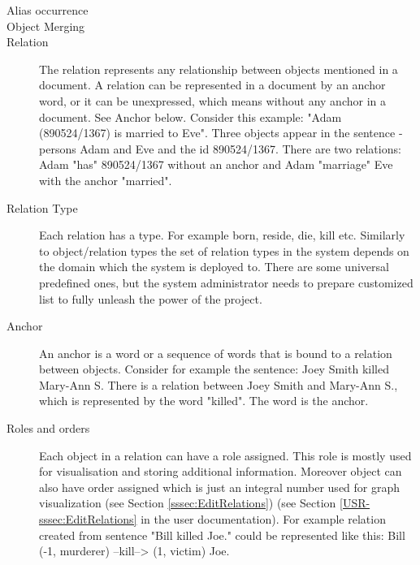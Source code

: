 \begin{description}
\item[Alias occurrence]

\item[Object Merging]

\item[Relation]
The relation represents any relationship between objects mentioned in a document.
A relation can be represented in a document by an anchor word, or it can be
unexpressed, which means without any anchor in a document. See Anchor below.
Consider this example: "Adam (890524/1367) is married to Eve". Three objects
appear in the sentence - persons Adam and Eve and the id 890524/1367. There
are two relations: Adam "has" 890524/1367 without an anchor and Adam "marriage"
Eve with the anchor "married".

\item[Relation Type]
Each relation has a type. For example born, reside, die, kill etc. Similarly to
object/relation types the set of relation types in the system depends on the
domain which the system is deployed to. There are some universal predefined 
ones, but the system administrator needs to prepare customized list to fully 
unleash the power of the project. 

\item[Anchor]
An anchor is a word or a sequence of words that is bound to a relation between
objects. Consider for example the sentence: Joey Smith killed Mary-Ann S. There
is a relation between Joey Smith and Mary-Ann S., which is represented by the
word "killed". The word is the anchor. 

\item[Roles and orders]
Each object in a relation can have a role assigned. This role is mostly used
for visualisation and storing additional information. Moreover object can also
have order assigned which is just an integral number used for graph
visualization\ifdefined\USRDOC{} (see Section \ref{sssec:EditRelations})\fi{}
\ifdefined\DEVDOC{} (see Section \ref{USR-sssec:EditRelations} in the user
documentation)\fi{}. For example relation created from sentence
"Bill killed Joe." could be represented like this:
Bill (-1, murderer) --kill--> (1, victim) Joe.
\end{description}

